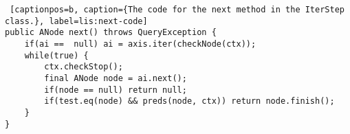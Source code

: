 \begin{lstlisting} [captionpos=b, caption={The code for the next method in the IterStep class.}, label=lis:next-code] 
public ANode next() throws QueryException {
	if(ai ==  null) ai = axis.iter(checkNode(ctx));
	while(true) {
		ctx.checkStop();
		final ANode node = ai.next();
		if(node == null) return null;
		if(test.eq(node) && preds(node, ctx)) return node.finish();
	}
}
\end{lstlisting}
